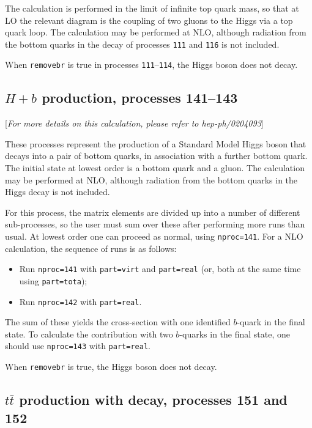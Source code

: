 \documentclass[12pt]{article}
\begin{document}
The calculation is performed in the
limit of infinite top quark mass, so that at LO the relevant diagram
is the coupling of two gluons to the Higgs via a top quark loop.
The calculation may be performed at NLO, although radiation from the
bottom quarks in the decay of processes {\tt 111} and {\tt 116} is not included.

When {\tt removebr} is true in processes {\tt 111}--{\tt 114},
the Higgs boson does not decay.

\subsection{$H+b$ production, processes 141--143}
\label{subsec:Hb}

\begin{center}
[{\it For more details on this calculation, please refer to hep-ph/0204093}]
\end{center}

These processes represent the production of a Standard Model Higgs
boson that decays into a pair of bottom quarks,
in association with a further bottom quark. The initial state at lowest order
is a bottom quark and a gluon.
The calculation may be performed at NLO, although radiation from the
bottom quarks in the Higgs decay is not included.

For this process, the matrix elements are divided up into a number of
different sub-processes, so the user must sum over these after performing
more runs than usual. At lowest order one can proceed as normal, using
{\tt nproc=141}. For a NLO calculation, the sequence of runs is as follows:
\begin{itemize}
\item Run {\tt nproc=141} with {\tt part=virt} and {\tt part=real} (or, both
at the same time using {\tt part=tota});
\item Run {\tt nproc=142} with {\tt part=real}.
\end{itemize}
The sum of these yields the cross-section with one identified $b$-quark in
the final state. To calculate the contribution with two $b$-quarks in the
final state, one should use {\tt nproc=143} with {\tt part=real}.

When {\tt removebr} is true, the Higgs boson does not decay.

\subsection{$t\bar{t}$ production with decay, processes 151 and 152}
\end{document}
